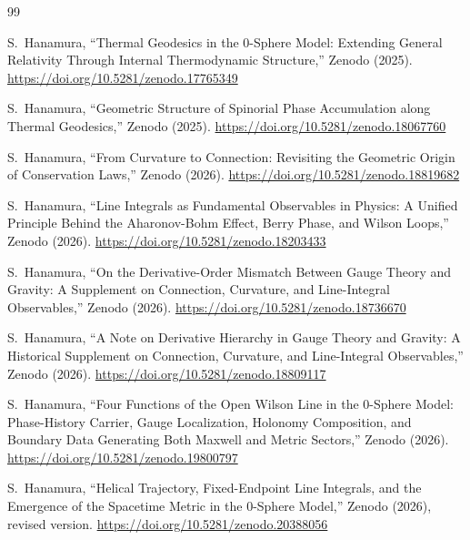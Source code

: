 \documentclass[%
 reprint, amsmath,amssymb, aps, prb, ]{revtex4-2}
\numberwithin{equation}{section}
\begin{document}
\clearpage

\begin{thebibliography}{99}

S.~Hanamura,
``Thermal Geodesics in the 0-Sphere Model: Extending General Relativity Through Internal Thermodynamic Structure,''
Zenodo (2025).
\href{https://doi.org/10.5281/zenodo.17765349}{https://doi.org/10.5281/zenodo.17765349}

S.~Hanamura,
``Geometric Structure of Spinorial Phase Accumulation along Thermal Geodesics,''
Zenodo (2025).
\href{https://doi.org/10.5281/zenodo.18067760}{https://doi.org/10.5281/zenodo.18067760}

S.~Hanamura,
``From Curvature to Connection: Revisiting the Geometric Origin of Conservation Laws,''
Zenodo (2026).
\href{https://doi.org/10.5281/zenodo.18819682}{https://doi.org/10.5281/zenodo.18819682}

S.~Hanamura,
``Line Integrals as Fundamental Observables in Physics: A Unified Principle Behind the Aharonov-Bohm Effect, Berry Phase, and Wilson Loops,''
Zenodo (2026).
\href{https://doi.org/10.5281/zenodo.18203433}{https://doi.org/10.5281/zenodo.18203433}

S.~Hanamura,
``On the Derivative-Order Mismatch Between Gauge Theory and Gravity: A Supplement on Connection, Curvature, and Line-Integral Observables,''
Zenodo (2026).
\href{https://doi.org/10.5281/zenodo.18736670}{https://doi.org/10.5281/zenodo.18736670}

S.~Hanamura,
``A Note on Derivative Hierarchy in Gauge Theory and Gravity: A Historical Supplement on Connection, Curvature, and Line-Integral Observables,''
Zenodo (2026).
\href{https://doi.org/10.5281/zenodo.18809117}{https://doi.org/10.5281/zenodo.18809117}

S.~Hanamura,
``Four Functions of the Open Wilson Line in the 0-Sphere Model: Phase-History Carrier, Gauge Localization, Holonomy Composition, and Boundary Data Generating Both Maxwell and Metric Sectors,''
Zenodo (2026).
\href{https://doi.org/10.5281/zenodo.19800797}{https://doi.org/10.5281/zenodo.19800797}

S.~Hanamura,
``Helical Trajectory, Fixed-Endpoint Line Integrals, and the Emergence of the Spacetime Metric in the 0-Sphere Model,''
Zenodo (2026), revised version.
\href{https://doi.org/10.5281/zenodo.20388056}{https://doi.org/10.5281/zenodo.20388056}


\end{thebibliography}
\end{document}
